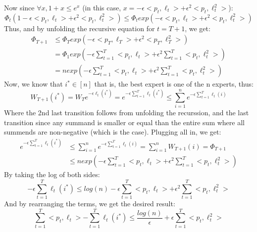Now since $\forall x, 1 + x\leq e^x$ (in this case, $x = -\epsilon <p_t, \ell_t> + \epsilon^2 <p_t, \ell^2_t>$):
\begin{equation*}
    \Phi_t(1 - \epsilon <p_t, \ell_t> + \epsilon^2 <p_t, \ell^2_t>) 
    \leq \Phi_t exp(-\epsilon <p_t, \ell_t> + \epsilon^2 <p_t, \ell^2_t>)
\end{equation*}
Thus, and by unfolding the recursive equation for $t=T+1$, we get:
\begin{equation*}
    \begin{split}        
        \Phi_{T+1} &\leq \Phi_T exp(-\epsilon <p_T, \ell_T> + \epsilon^2 <p_T, \ell^2_T>) \\
        &= \Phi_1 exp(-\epsilon \sum_{t=1}^T<p_t, \ell_t> + \epsilon^2 \sum_{t=1}^T <p_t, \ell^2_t>)\\
        &= n exp(-\epsilon \sum_{t=1}^T<p_t, \ell_t> + \epsilon^2 \sum_{t=1}^T <p_t, \ell^2_t>)
    \end{split}
\end{equation*}
Now, we know that $i^*\in [n]$ that is, the best expert is one of the n experts, thus:
\begin{equation*}
    W_{T+1}(i^*) = W_T e^{-\epsilon \ell_t(i^*)} = e^{-\epsilon \sum_{t=1}^T\ell_t(i^*)} \leq \sum_{i=1}^n e^{-\epsilon \sum_{t=1}^T\ell_t(i)}
\end{equation*}
Where the 2nd last transition follows from unfolding the recurssion, and the last transition since any summand is smaller or equal than the entire sum where all summends are non-negative (which is the case).
Plugging all in, we get:
\begin{equation*}
    \begin{split}        
        e^{-\epsilon \sum_{t=1}^T\ell_t(i^*)} 
        &\leq \sum_{i=1}^n e^{-\epsilon \sum_{t=1}^T\ell_t(i)} = \sum_{i=1}^n W_{T+1}(i) = \Phi_{T+1} \\ 
        &\leq n exp(-\epsilon \sum_{t=1}^T<p_t, \ell_t> + \epsilon^2 \sum_{t=1}^T <p_t, \ell^2_t>)
    \end{split}
\end{equation*}
By taking the log of both sides:
\begin{equation*}
    -\epsilon \sum_{t=1}^T\ell_t(i^*) \leq log(n) -\epsilon \sum_{t=1}^T<p_t, \ell_t> + \epsilon^2 \sum_{t=1}^T <p_t, \ell^2_t>
\end{equation*}
And by rearranging the terms, we get the desired result:
\begin{equation*}
    \sum_{t=1}^T<p_t, \ell_t> - \sum_{t=1}^T\ell_t(i^*) \leq \frac{log(n)}{\epsilon} + \epsilon \sum_{t=1}^T <p_t, \ell^2_t>
\end{equation*}
